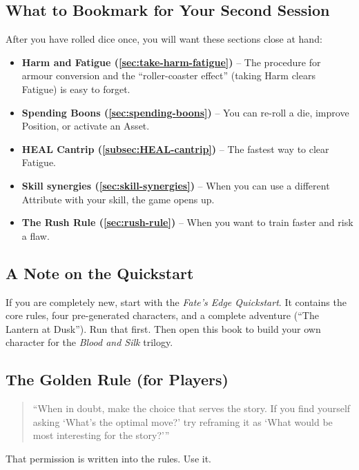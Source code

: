 \subsection*{What to Bookmark for Your Second Session}

After you have rolled dice once, you will want these sections close at hand:

\begin{itemize}
    \item \textbf{Harm and Fatigue (\autoref{sec:take-harm-fatigue})} -- The procedure for armour conversion and the ``roller-coaster effect'' (taking Harm clears Fatigue) is easy to forget.
    \item \textbf{Spending Boons (\autoref{sec:spending-boons})} -- You can re-roll a die, improve Position, or activate an Asset.
    \item \textbf{HEAL Cantrip (\autoref{subsec:HEAL-cantrip})} -- The fastest way to clear Fatigue.
    \item \textbf{Skill synergies (\autoref{sec:skill-synergies})} -- When you can use a different Attribute with your skill, the game opens up.
    \item \textbf{The Rush Rule (\autoref{sec:rush-rule})} -- When you want to train faster and risk a flaw.
\end{itemize}

\subsection*{A Note on the Quickstart}

If you are completely new, start with the \textit{Fate's Edge Quickstart}. It contains the core rules, four pre-generated characters, and a complete adventure (``The Lantern at Dusk''). Run that first. Then open this book to build your own character for the \textit{Blood and Silk} trilogy.

\subsection*{The Golden Rule (for Players)}

\begin{quote}
``When in doubt, make the choice that serves the story. If you find yourself asking `What's the optimal move?' try reframing it as `What would be most interesting for the story?'''
\end{quote}

That permission is written into the rules. Use it.

